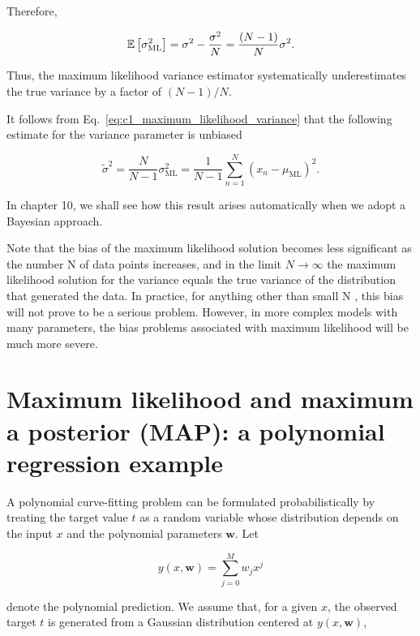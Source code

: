 \documentclass[10pt,twocolumn]{memoir}
\begin{document}
Therefore,

\begin{equation}
    \mathbb{E}\left[\sigma_{\mathrm{ML}}^2\right]
    = \sigma^2 - \frac{\sigma^2}{N} \\
    = \frac{(N-1)}{N}\sigma^2.
\label{eq:c1_maximum_likelihood_variance}
\end{equation}

Thus, the maximum likelihood variance estimator systematically underestimates the true variance by a factor of $(N-1)/N$.

It follows from Eq.~\ref{eq:c1_maximum_likelihood_variance} that the following estimate for the variance parameter is unbiased

\begin{equation}
    \widetilde{\sigma}^2 = \frac{N}{N-1}\sigma_{\mathrm{ML}}^2 = \frac{1}{N-1}\sum_{n=1}^{N}(x_n-\mu_{\mathrm{ML}})^2.
\end{equation}

In chapter 10, we shall see how this result arises automatically when we adopt a Bayesian approach.

Note that the bias of the maximum likelihood solution becomes less signiﬁcant as the number N of data points increases, and in the limit $N\to\infty$ the maximum likelihood solution for the variance equals the true variance of the distribution that generated the data. In practice, for anything other than small N , this bias will not prove to be a serious problem. However, in more complex models with many parameters, the bias problems associated with maximum likelihood will be much more severe.

\section{Maximum likelihood and maximum a posterior (MAP): a polynomial regression example}

A polynomial curve-fitting problem can be formulated probabilistically by treating the target value $t$ as a random variable whose distribution depends on the input $x$ and the polynomial parameters $\mathbf{w}$. Let

\begin{equation}
    y(x,\mathbf{w}) = \sum_{j=0}^{M} w_j x^j
\end{equation}

denote the polynomial prediction. We assume that, for a given $x$, the observed target $t$ is generated from a Gaussian distribution centered at $y(x,\mathbf{w})$,
\end{document}
